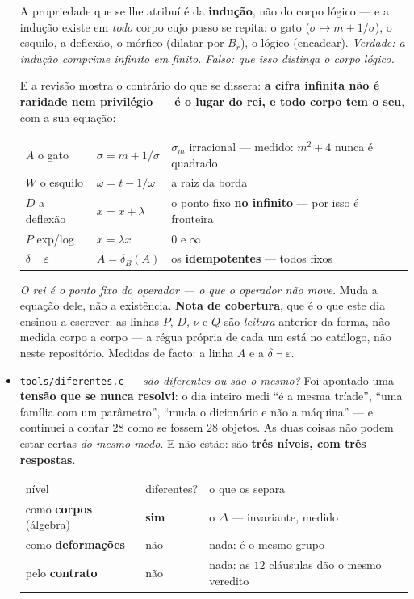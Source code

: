 \documentclass[11pt]{article}
\newcommand{\code}[1]{\texttt{\small #1}}
\theoremstyle{plain}
\theoremstyle{remark}
\begin{document}
\begin{itemize}
A propriedade que se lhe atribuí é da \textbf{indução}, não do corpo lógico --- e a indução existe
em \emph{todo} corpo cujo passo se repita: o gato ($\sigma \mapsto m + 1/\sigma$), o esquilo, a
deflexão, o mórfico (dilatar por $B_r$), o lógico (encadear). \emph{Verdade: a indução comprime
infinito em finito. Falso: que isso distinga o corpo lógico.}

E a revisão mostra o contrário do que se dissera: \textbf{a cifra infinita não é raridade nem
privilégio --- é o lugar do rei, e todo corpo tem o seu}, com a sua equação:

\begin{center}\begin{tabular}{lll}
$A$ o gato & $\sigma = m + 1/\sigma$ & $\sigma_m$ irracional --- medido: $m^2{+}4$ nunca é quadrado \\
$W$ o esquilo & $\omega = t - 1/\omega$ & a raiz da borda \\
$D$ a deflexão & $x = x + \lambda$ & o ponto fixo \textbf{no infinito} --- por isso é fronteira \\
$P$ exp/log & $x = \lambda x$ & $0$ e $\infty$ \\
$\delta\dashv\varepsilon$ & $A = \delta_B(A)$ & os \textbf{idempotentes} --- todos fixos \\
\end{tabular}\end{center}

\emph{O rei é o ponto fixo do operador --- o que o operador não move}. Muda a equação dele, não a
existência. \textbf{Nota de cobertura}, que é o que este dia ensinou a escrever: as linhas $P$,
$D$, $\nu$ e $Q$ são \emph{leitura} anterior da forma, não medida corpo a corpo --- a régua própria
de cada um está no catálogo, não neste repositório. Medidas de facto: a linha $A$ e a
$\delta\dashv\varepsilon$.
\item \code{tools/diferentes.c} --- \emph{são diferentes ou são o mesmo?} Foi apontado uma
\textbf{tensão que se nunca resolvi}: o dia inteiro medi ``é a mesma tríade'', ``uma família com
um parâmetro'', ``muda o dicionário e não a máquina'' --- e continuei a contar $28$ como se fossem
$28$ objetos. As duas coisas não podem estar certas \emph{do mesmo modo}. E não estão: são
\textbf{três níveis, com três respostas}.

\begin{center}\begin{tabular}{lll}
nível & diferentes? & o que os separa \\
como \textbf{corpos} (álgebra) & \textbf{sim} & o $\Delta$ --- invariante, medido \\
como \textbf{deformações} & não & nada: é o mesmo grupo \\
pelo \textbf{contrato} & não & nada: as $12$ cláusulas dão o mesmo veredito \\
\end{tabular}\end{center}


\end{itemize}
\end{document}
